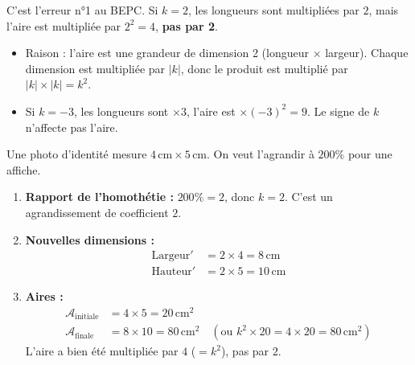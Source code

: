 \documentclass[11pt]{article}
\begin{document}
\begin{attention}
C'est l'erreur n°1 au BEPC. Si $k=2$, les longueurs sont multipliées par $2$, mais l'aire est multipliée par $2^2 = 4$, \textbf{pas par 2}.
\begin{itemize}
    \item Raison : l'aire est une grandeur de dimension 2 (longueur $\times$ largeur). Chaque dimension est multipliée par $|k|$, donc le produit est multiplié par $|k| \times |k| = k^2$.
    \item Si $k=-3$, les longueurs sont $\times 3$, l'aire est $\times (-3)^2 = 9$. Le signe de $k$ n'affecte pas l'aire.
\end{itemize}
\end{attention}

\begin{exemplebox}
Une photo d'identité mesure $4\,\text{cm} \times 5\,\text{cm}$. On veut l'agrandir à $200\%$ pour une affiche.
\begin{enumerate}
    \item \textbf{Rapport de l'homothétie :} $200\% = 2$, donc $k = 2$. C'est un agrandissement de coefficient $2$.
    \item \textbf{Nouvelles dimensions :}
    \begin{align*}
        \text{Largeur}' &= 2 \times 4 = 8\,\text{cm} \\
        \text{Hauteur}' &= 2 \times 5 = 10\,\text{cm}
    \end{align*}
    \item \textbf{Aires :}
    \begin{align*}
        \mathcal{A}_{\text{initiale}} &= 4 \times 5 = 20\,\text{cm}^2 \\
        \mathcal{A}_{\text{finale}} &= 8 \times 10 = 80\,\text{cm}^2 \quad (\text{ou } k^2 \times 20 = 4 \times 20 = 80\,\text{cm}^2)
    \end{align*}
    L'aire a bien été multipliée par $4$ ($=k^2$), pas par $2$.
\end{enumerate}
\end{exemplebox}
\end{document}
